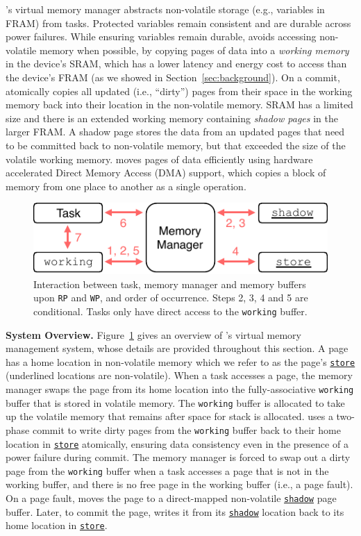 \sys's virtual memory manager \sys abstracts non-volatile storage (e.g.,
variables in FRAM) from tasks.
%
Protected variables remain consistent and are durable across power failures.
%
While ensuring variables remain durable, \sys avoids accessing non-volatile
memory when possible, by copying pages of data into a {\em working memory} in the device's SRAM, which
has a lower latency and energy cost to access than the device's FRAM (as we
showed in Section~\ref{sec:background}).
%
On a commit, \sys atomically copies all updated (i.e., ``dirty'') pages from their
space in the working memory back into their location in the non-volatile
memory.
%
SRAM has a limited size and there is an extended working memory containing {\em
shadow pages} in the larger FRAM.  A shadow page stores the data from an
updated pages that need to be committed back to non-volatile memory, but that
exceeded the size of the volatile working memory.
%
\sys moves pages of data efficiently using hardware accelerated Direct Memory
Access (DMA) support, which copies a block of memory from one place to another
as a single operation.\\
%
\begin{figure}
    \centering
    \includegraphics[width=\columnwidth]{figures/mem-man.pdf}
    \caption{Interaction between task, memory manager and memory buffers upon \texttt{RP} and \texttt{WP},
    and order of occurrence. Steps 2, 3, 4 and 5 are conditional. Tasks only have direct access to the
    \texttt{working} buffer.}
    \label{figure:mem-man}
\end{figure}
%
\textbf{System Overview.}
Figure~\ref{figure:mem-man} gives an overview of \sys's virtual memory management system,
whose details are provided throughout this section.
A page has a home location in non-volatile memory which we refer to as the page's
\texttt{\underline{store}} (underlined locations are non-volatile).  When a
task accesses a page, the memory manager swaps the page from its home location
into the fully\hyp{}associative \texttt{working} buffer that is stored in
volatile memory.  The \texttt{working} buffer is allocated to take up the
volatile memory that remains after space for stack is allocated.
%
\sys uses a two-phase commit to write dirty pages from the \texttt{working}
buffer back to their home location in \texttt{\underline{store}} atomically,
ensuring data consistency even in the presence of a power failure during commit.
%
The memory manager is forced to swap out a dirty page from the \texttt{working} buffer
when a task accesses a page that is not in the working buffer, and there is no
free page in the working buffer (i.e., a page fault). On a page fault, \sys
moves the page to a direct\hyp{}mapped non-volatile \texttt{\underline{shadow}}
page buffer. Later, to commit the page, \sys writes it from its
\texttt{\underline{shadow}} location back to its home location in
\texttt{\underline{store}}.
%
